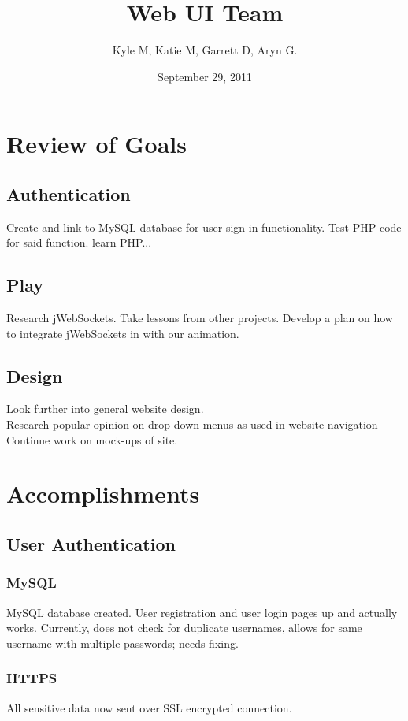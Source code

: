 




\title{Web UI Team}
\author{Kyle M, Katie M, Garrett D, Aryn G.}
\date{September 29, 2011}
\maketitle


\section{Review of Goals}
	\subsection{Authentication}
	Create and link to MySQL database for user sign-in functionality. Test PHP code for said function. learn PHP...
	\subsection{Play}
	Research jWebSockets. Take lessons from other projects. Develop a plan on how to integrate jWebSockets in with our animation.
	\subsection{Design}
	Look further into general website design.\\Research popular opinion on drop-down menus as used in website navigation\\Continue work on mock-ups of site.

\section{Accomplishments}
	\subsection{User Authentication}
		\subsubsection{MySQL}
		MySQL database created. User registration and user login pages up and actually works. Currently, does not check for duplicate usernames, allows for same username with multiple passwords; needs fixing.
		\subsubsection{HTTPS}
		All sensitive data now sent over SSL encrypted connection. 
